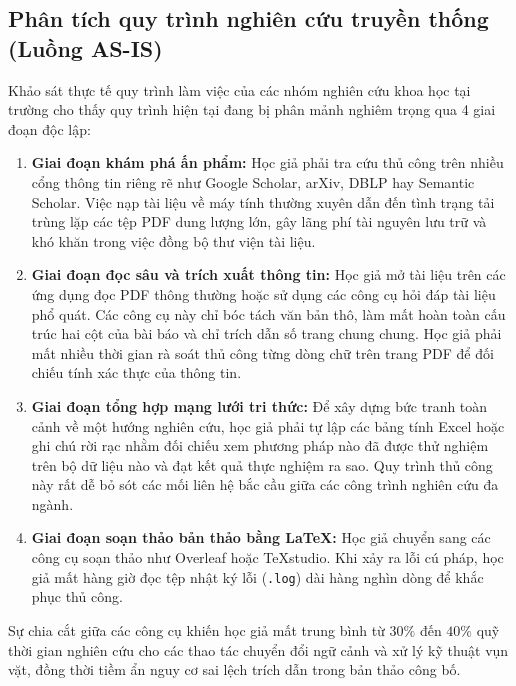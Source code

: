 \subsection{Phân tích quy trình nghiên cứu truyền thống (Luồng AS-IS)}
\label{subsec:luong_as_is}
Khảo sát thực tế quy trình làm việc của các nhóm nghiên cứu khoa học tại trường cho thấy quy trình hiện tại đang bị phân mảnh nghiêm trọng qua 4 giai đoạn độc lập:
\begin{enumerate}[label=\textbf{(\arabic*)}]
    \item \textbf{Giai đoạn khám phá ấn phẩm:} Học giả phải tra cứu thủ công trên nhiều cổng thông tin riêng rẽ như Google Scholar, arXiv, DBLP hay Semantic Scholar. Việc nạp tài liệu về máy tính thường xuyên dẫn đến tình trạng tải trùng lặp các tệp PDF dung lượng lớn, gây lãng phí tài nguyên lưu trữ và khó khăn trong việc đồng bộ thư viện tài liệu.
    \item \textbf{Giai đoạn đọc sâu và trích xuất thông tin:} Học giả mở tài liệu trên các ứng dụng đọc PDF thông thường hoặc sử dụng các công cụ hỏi đáp tài liệu phổ quát. Các công cụ này chỉ bóc tách văn bản thô, làm mất hoàn toàn cấu trúc hai cột của bài báo và chỉ trích dẫn số trang chung chung. Học giả phải mất nhiều thời gian rà soát thủ công từng dòng chữ trên trang PDF để đối chiếu tính xác thực của thông tin.
    \item \textbf{Giai đoạn tổng hợp mạng lưới tri thức:} Để xây dựng bức tranh toàn cảnh về một hướng nghiên cứu, học giả phải tự lập các bảng tính Excel hoặc ghi chú rời rạc nhằm đối chiếu xem phương pháp nào đã được thử nghiệm trên bộ dữ liệu nào và đạt kết quả thực nghiệm ra sao. Quy trình thủ công này rất dễ bỏ sót các mối liên hệ bắc cầu giữa các công trình nghiên cứu đa ngành.
    \item \textbf{Giai đoạn soạn thảo bản thảo bằng \LaTeX:} Học giả chuyển sang các công cụ soạn thảo như Overleaf hoặc TeXstudio. Khi xảy ra lỗi cú pháp, học giả mất hàng giờ đọc tệp nhật ký lỗi (\texttt{.log}) dài hàng nghìn dòng để khắc phục thủ công.
\end{enumerate}

Sự chia cắt giữa các công cụ khiến học giả mất trung bình từ $30\%$ đến $40\%$ quỹ thời gian nghiên cứu cho các thao tác chuyển đổi ngữ cảnh và xử lý kỹ thuật vụn vặt, đồng thời tiềm ẩn nguy cơ sai lệch trích dẫn trong bản thảo công bố.

